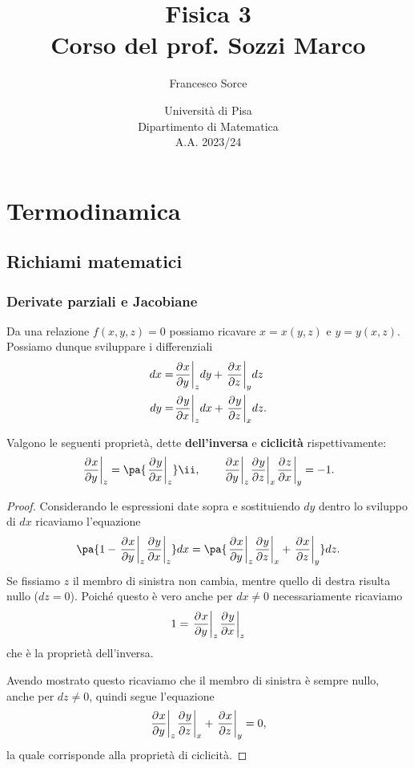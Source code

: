 \documentclass[a4paper]{report}
\title{Fisica 3\\
\large Corso del prof. Sozzi Marco}
\author{Francesco Sorce}
\date{Università di Pisa\\
Dipartimento di Matematica\\
A.A. 2023/24}
\begin{document}
\maketitle

\tableofcontents
\newpage


\part{Termodinamica}







\appendix
\chapter{Richiami matematici}
\section{Derivate parziali e Jacobiane}
Da una relazione $f(x,y,z)=0$ possiamo ricavare $x=x(y,z)$ e $y=y(x,z)$.\\
Possiamo dunque sviluppare i differenziali
\begin{align*}
dx=&\ppb yxzdy+\ppb zxydz\\
dy=&\ppb xyzdx+\ppb zyxdz.
\end{align*}

\begin{proposition}\label{ProprietaDerivateParziali}
Valgono le seguenti propriet\`a, dette \textbf{dell'inversa} e \textbf{ciclicit\`a} rispettivamente:
\[\ppb yxz=\pa{\ppb xyz}\ii,\qquad \ppb yxz\ppb zyx\ppb xzy=-1.\]
\end{proposition}
\begin{proof}
Considerando le espressioni date sopra e sostituiendo $dy$ dentro lo sviluppo di $dx$ ricaviamo l'equazione
\[\pa{1-\ppb yxz\ppb xyz}dx=\pa{\ppb yxz\ppb zyx+\ppb zxy}dz.\]
Se fissiamo $z$ il membro di sinistra non cambia, mentre quello di destra risulta nullo ($dz=0$). Poich\'e questo \`e vero anche per $dx\neq 0$ necessariamente ricaviamo
\[1=\ppb yxz\ppb xyz\]
che \`e la propriet\`a dell'inversa.\medskip

\noindent Avendo mostrato questo ricaviamo che il membro di sinistra \`e sempre nullo, anche per $dz\neq 0$, quindi segue l'equazione
\[\ppb yxz\ppb zyx+\ppb zxy=0,\]
la quale corrisponde alla propriet\`a di ciclicit\`a.
\end{proof}
\end{document}
